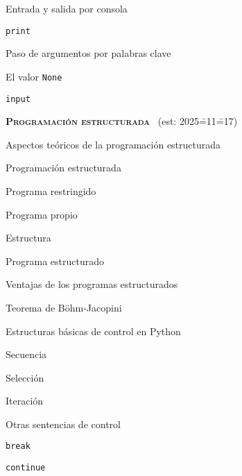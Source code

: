 \begin{longenum}
\begin{longenum}
\begin{longenum}
\begin{longenum}
            \end{longenum}
        \end{longenum}
        \item Entrada y salida por consola
        \begin{longenum}
            \item \texttt{print}
            \begin{longenum}
                \item Paso de argumentos por palabras clave
                \item El valor \texttt{None}
            \end{longenum}
            \item \texttt{input}
        \end{longenum}
    \end{longenum}
    \item \textbf{\textsc{Programación estructurada}} \ (est: 2025\==11\==17)
    \begin{longenum}
        \item Aspectos teóricos de la programación estructurada
        \begin{longenum}
            \item Programación estructurada
            \item Programa restringido
            \item Programa propio
            \item Estructura
            \item Programa estructurado
            \begin{longenum}
                \item Ventajas de los programas estructurados
            \end{longenum}
            \item Teorema de Böhm-Jacopini
        \end{longenum}
        \item Estructuras básicas de control en Python
        \begin{longenum}
            \item Secuencia
            \item Selección
            \item Iteración
            \item Otras sentencias de control
            \begin{longenum}
                \item \texttt{break}
                \item \texttt{continue}

\end{longenum}
\end{longenum}
\end{longenum}
\end{longenum}
